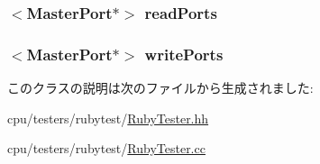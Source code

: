 \label{classRubyTester_a40394bd6ef55e1c6f0d6d614b2039886}
\hypertarget{classRubyTester_a932d2fee1f64944ee00898b8d4a17112}{
\subsubsection[{readPorts}]{$<${\bf MasterPort}$\ast$$>$ {\bf readPorts}}}
\label{classRubyTester_a932d2fee1f64944ee00898b8d4a17112}
\hypertarget{classRubyTester_ac70f96ce30f653210523935c455b76f4}{
\subsubsection[{writePorts}]{$<${\bf MasterPort}$\ast$$>$ {\bf writePorts}}}
\label{classRubyTester_ac70f96ce30f653210523935c455b76f4}


このクラスの説明は次のファイルから生成されました:\begin{DoxyCompactItemize}
\item 
cpu/testers/rubytest/\hyperlink{RubyTester_8hh}{RubyTester.hh}\item 
cpu/testers/rubytest/\hyperlink{RubyTester_8cc}{RubyTester.cc}\end{DoxyCompactItemize}
